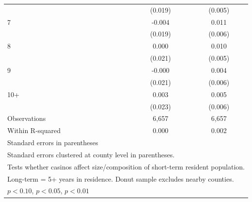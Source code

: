 \begin{table}[htbp]
\begin{tabular}{l*{2}{c}}
            &     (0.019)         &     (0.005)         \\
[1em]
7           &      -0.004         &       0.011\sym{*}  \\
            &     (0.019)         &     (0.006)         \\
[1em]
8           &       0.000         &       0.010\sym{*}  \\
            &     (0.021)         &     (0.005)         \\
[1em]
9           &      -0.000         &       0.004         \\
            &     (0.021)         &     (0.006)         \\
[1em]
10+         &       0.003         &       0.005         \\
            &     (0.023)         &     (0.006)         \\
\hline
Observations&       6,657         &       6,657         \\
Within R-squared&       0.000         &       0.002         \\
\hline\hline
\multicolumn{3}{l}{\footnotesize Standard errors in parentheses}\\
\multicolumn{3}{l}{\footnotesize Standard errors clustered at county level in parentheses.}\\
\multicolumn{3}{l}{\footnotesize Tests whether casinos affect size/composition of short-term resident population.}\\
\multicolumn{3}{l}{\footnotesize Long-term = 5+ years in residence. Donut sample excludes nearby counties.}\\
\multicolumn{3}{l}{\footnotesize \sym{*} \(p<0.10\), \sym{**} \(p<0.05\), \sym{***} \(p<0.01\)}\\
\end{tabular}
\end{table}
